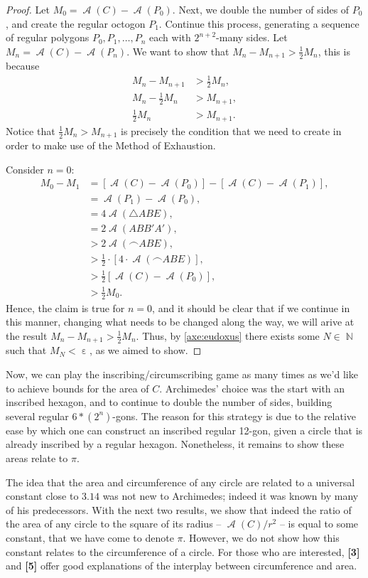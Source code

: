 \documentclass[letterpaper, 12pt]{amsart}
\DeclareMathOperator{\N}{\mathbb{N}}
\DeclareMathOperator{\A}{\mathcal{A}}
\DeclareMathOperator{\ep}{\varepsilon}
\theoremstyle{definition}  %
\begin{document}
\begin{proof}
		Let $M_{0} = \A(C) - \A(P_{0})$.
		Next, we double the number of sides of $P_{0}$, and create the regular octogon $P_{1}$.
		Continue this process, generating a sequence of regular polygons $P_{0}, P_{1}, \dots, P_{n}$ each with $2^{n+2}$-many sides.
		Let $M_{n} = \A(C) - \A(P_{n})$.
		We want to show that $M_{n} - M_{n+1} > \tfrac{1}{2}M_{n}$, this is because 
			\begin{align*}
			M_{n} - M_{n+1} &> \tfrac{1}{2}M_{n}, \\
			M_{n} - \tfrac{1}{2}M_{n} &> M_{n+1}, \\
			\tfrac{1}{2}M_{n} &> M_{n+1}.
			\end{align*}
		Notice that $\tfrac{1}{2}M_{n} > M_{n+1}$ is precisely the condition that we need to create in order to make use of the Method of Exhaustion.

		Consider $n = 0$:
			\begin{align*}
			M_{0} - M_{1} &= [\A(C) - \A(P_{0})] - [\A(C) - \A(P_{1})], \\
			&= \A(P_{1}) - \A(P_{0}), \\
			&= 4 \A(\triangle ABE), \\
			&= 2 \A(ABB'A'), \\
			&> 2 \A(\frown{ABE}), \\
			&> \tfrac{1}{2} \cdot \left[ 4 \cdot \A(\frown{ABE}) \right], \\
			&> \tfrac{1}{2} \left[ \A(C) - \A(P_{0}) \right], \\
			&> \tfrac{1}{2} M_{0}.
			\end{align*}
		Hence, the claim is true for $n=0$, and it should be clear that if we continue in this manner, changing what needs to be changed along the way, we will arive at the result $M_{n} - M_{n+1} > \tfrac{1}{2}M_{n}$.
		Thus, by \ref{axe:eudoxus} there exists some $N \in \N$ such that $M_{N} < \ep$, as we aimed to show.
		\end{proof}

		Now, we can play the inscribing/circumscribing game as many times as we'd like to achieve bounds for the area of $C$.
		Archimedes' choice was the start with an inscribed hexagon, and to continue to double the number of sides, building several regular $6*(2^{n})$-gons.
		The reason for this strategy is due to the relative ease by which one can construct an inscribed regular 12-gon, given a circle that is already inscribed by a regular hexagon.
		Nonetheless, it remains to show these areas relate to $\pi$.

		The idea that the area and circumference of any circle are related to a universal constant close to $3.14$ was not new to Archimedes; indeed it was known by many of his predecessors.
		With the next two results, we show that indeed the ratio of the area of any circle to the square of its radius -- $\A(C)/r^{2}$ -- is equal to some constant, that we have come to denote $\pi$.
		However, we do not show how this constant relates to the circumference of a circle.
		For those who are interested, \textbf{[3]} and \textbf{[5]} offer good explanations of the interplay between circumference and area.
\end{document}
